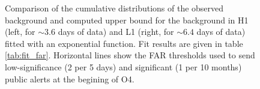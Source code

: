 \begin{figure}
\begin{minipage}{0.45\linewidth}
  \end{minipage}
  \hfill
  \caption{Comparison of the cumulative distributions of the observed background and computed upper bound for the background in H1 (left, for $\sim 3.6$ days of data) and L1 (right, for $\sim 6.4$ days of data) fitted with an exponential function. Fit results are given in table \ref{tab:fit_far}.
  Horizontal lines show the FAR thresholds used to send low-significance (2 per 5 days) and significant (1 per 10 months) public alerts at the begining of O4.}
  \label{fig:computed_rate_cumul}
\end{figure}
